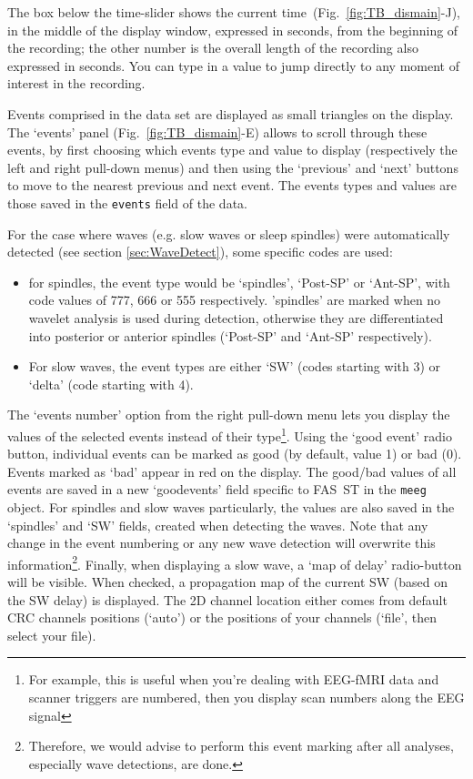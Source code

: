 \documentclass[a4paper,titlepage]{article}
\def\dblS{\hbox{S\hskip -4.5pt S}}
\newcommand{\bi}{\begin{itemize}}
\newcommand{\ei}{\end{itemize}}
\newcommand{\fasst}{FA\dblS T } 	%
\begin{document}
The box below the time-slider shows the current time~(Fig.~\ref{fig:TB_dismain}-J), in the middle of the display window, expressed in seconds, from the beginning of the recording; the other number is the overall length of the recording also expressed in seconds. You can type in a value to jump directly to any moment of interest in the recording.

Events comprised in the data set are displayed as small triangles on the display. The `events' panel  (Fig.~\ref{fig:TB_dismain}-E) allows to scroll through these events, by first choosing which events type and value to display (respectively the left and right pull-down menus) and then using the `previous' and `next' buttons to move to the nearest previous and next event. The events types and values are those saved in the {\tt events} field of the data.

For the case where waves (e.g. slow waves or sleep spindles) were automatically detected (see section \ref{sec:WaveDetect}), some specific codes are used:
\bi
\item for spindles, the event type would be `spindles', `Post-SP' or `Ant-SP', with code values of 777, 666 or 555 respectively. 'spindles' are marked when no wavelet analysis is used during detection, otherwise they are differentiated into posterior or anterior spindles (`Post-SP' and `Ant-SP' respectively). 
\item For slow waves, the event types are either `SW' (codes starting with 3) or `delta' (code starting with 4). 
\ei
The `events number' option from the right pull-down menu lets you display the values of the selected events instead of their type\footnote{For example, this is useful when you're dealing with EEG-fMRI data and scanner triggers are numbered, then you display scan numbers along the EEG signal}. Using the `good event' radio button, individual events can be marked as good (by default, value 1) or bad (0). Events marked as `bad' appear in red on the display. The good/bad values of all events are saved in a new `goodevents' field specific to \fasst in the {\tt meeg} object. For spindles and slow waves particularly, the values are also saved in the `spindles' and `SW' fields, created when detecting the waves. Note that any change in the event numbering or any new wave detection will overwrite this information\footnote{Therefore, we would advise to perform this event marking after all analyses, especially wave detections, are done.}. Finally, when displaying a slow wave, a `map of delay' radio-button will be visible. When checked, a propagation map of the current SW (based on the SW delay) is displayed. The 2D channel location either comes from default CRC channels positions (`auto') or the positions of your channels (`file', then select your file). 
\end{document}

